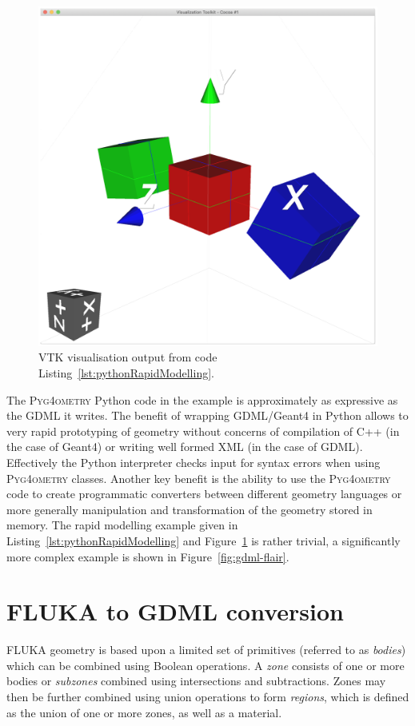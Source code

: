 \documentclass[final,5p,times,twocolumn]{elsarticle}
\newcommand{\PYGEOMETRY}{\textsc{Pyg4ometry}}
\begin{document}
\begin{figure}[htbp]
\begin{center}
\includegraphics[width=0.9\columnwidth]{./diagrams/rapidModelling.pdf}
\caption{VTK visualisation output from code Listing~\ref{lst:pythonRapidModelling}.}
\label{fig:rapidModellingExample}
\end{center}
\end{figure}

The \PYGEOMETRY{} Python code in the example is approximately as expressive 
as the GDML it writes. The benefit of wrapping GDML/Geant4 in Python allows 
to very rapid prototyping of geometry without concerns of compilation of C++ (in the 
case of Geant4) or writing well formed XML (in the case of GDML). Effectively
the Python interpreter checks input for syntax errors when using \PYGEOMETRY{} classes. 
Another key benefit is the ability to use the \PYGEOMETRY{} code to create 
programmatic converters between different geometry languages or more generally 
manipulation and transformation of the geometry stored in memory. The rapid modelling 
example given in Listing~\ref{lst:pythonRapidModelling} and Figure~\ref{fig:rapidModellingExample} 
is rather trivial, a significantly more complex example is shown in Figure~\ref{fig:gdml-flair}.

\section{FLUKA to GDML conversion}
FLUKA geometry is based upon a limited set of primitives (referred to as
\textit{bodies}) which can be combined using Boolean operations. A
\textit{zone} consists of one or more bodies or \textit{subzones} combined
using intersections and subtractions.  Zones may then be further combined
using union operations to form \textit{regions}, which is defined as the
union of one or more zones, as well as a material.
\end{document}
